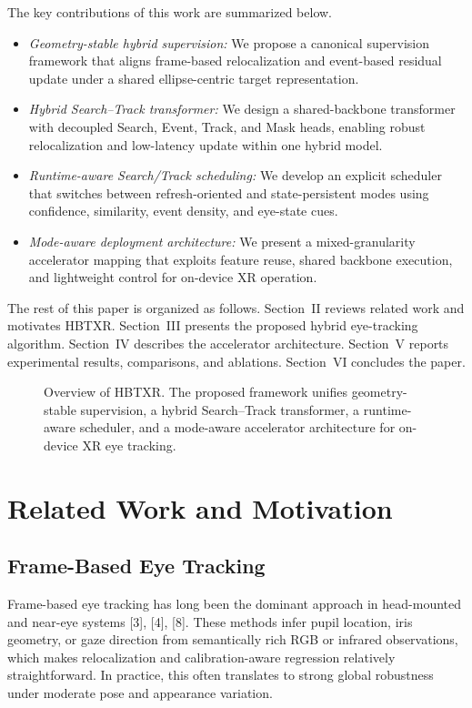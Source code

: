 \documentclass[journal]{IEEEtran}
\newcommand{\placeholderfigure}[2]{%
  \fbox{\parbox[c][#2][c]{#1}{\centering\vspace{2mm}\textbf{Figure placeholder}\\Final artwork pending\vspace{2mm}}}}
\begin{document}
The key contributions of this work are summarized below.
\begin{itemize}
    \item \emph{Geometry-stable hybrid supervision:} We propose a canonical supervision framework that aligns frame-based relocalization and event-based residual update under a shared ellipse-centric target representation.
    \item \emph{Hybrid Search--Track transformer:} We design a shared-backbone transformer with decoupled Search, Event, Track, and Mask heads, enabling robust relocalization and low-latency update within one hybrid model.
    \item \emph{Runtime-aware Search/Track scheduling:} We develop an explicit scheduler that switches between refresh-oriented and state-persistent modes using confidence, similarity, event density, and eye-state cues.
    \item \emph{Mode-aware deployment architecture:} We present a mixed-granularity accelerator mapping that exploits feature reuse, shared backbone execution, and lightweight control for on-device XR operation.
\end{itemize}

The rest of this paper is organized as follows. Section~II reviews related work and motivates HBTXR. Section~III presents the proposed hybrid eye-tracking algorithm. Section~IV describes the accelerator architecture. Section~V reports experimental results, comparisons, and ablations. Section~VI concludes the paper.

\begin{figure}[t]
\centering
\placeholderfigure{0.93\textwidth}{2.05in}
\caption{Overview of HBTXR. The proposed framework unifies geometry-stable supervision, a hybrid Search--Track transformer, a runtime-aware scheduler, and a mode-aware accelerator architecture for on-device XR eye tracking.}
\label{fig:overview}
\end{figure}

\section{Related Work and Motivation}
\subsection{Frame-Based Eye Tracking}
Frame-based eye tracking has long been the dominant approach in head-mounted and near-eye systems [3], [4], [8]. These methods infer pupil location, iris geometry, or gaze direction from semantically rich RGB or infrared observations, which makes relocalization and calibration-aware regression relatively straightforward. In practice, this often translates to strong global robustness under moderate pose and appearance variation.
\end{document}

